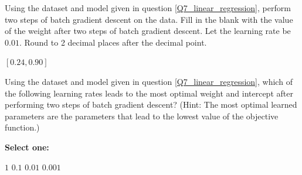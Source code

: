 \documentclass[11pt,addpoints,answers]{exam}
\numberwithin{equation}{section} %
\numberwithin{figure}{section} %
\numberwithin{table}{section} %
\begin{document}
\begin{questions}
    
    
    \newpage
    \question[2] Using the dataset and model given in question \ref{Q7_linear_regression}, perform two steps of batch gradient descent on the data. Fill in the blank with the value of the weight after two steps of batch gradient descent. Let the learning rate be $0.01$. Round to 2 decimal places after the decimal point.
    
    \begin{tcolorbox}[fit,height=1cm, width=4cm, blank, borderline={1pt}{-2pt},nobeforeafter, top=2pt, left=2pt, right=2pt, bottom=2pt]
	    $[0.24, 0.90]$
    \end{tcolorbox}
    
    
    
    \question[2]  Using the dataset and model given in question \ref{Q7_linear_regression}, which of the following learning rates leads to the most optimal weight and intercept after performing two steps of batch gradient descent? (Hint: The most optimal learned parameters are the parameters that lead to the lowest value of the objective function.)
    
    \textbf{Select one:}
    \begin{checkboxes}
        \choice $1$
        \choice $0.1$
        \CorrectChoice $0.01$
        \choice $0.001$
    \end{checkboxes}
    
    
    

    \clearpage
\end{questions}


\clearpage

\end{document}
